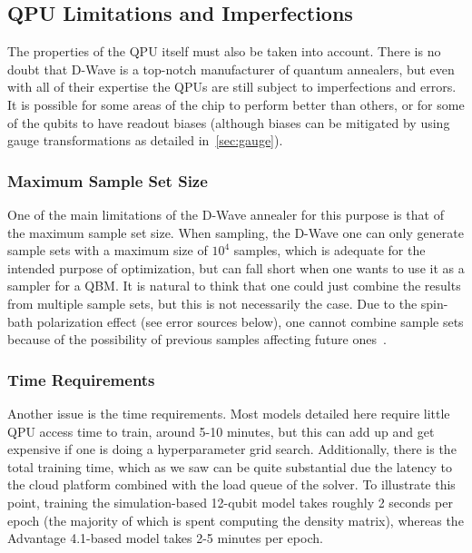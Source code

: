 \subsection{QPU Limitations and Imperfections}
The properties of the QPU itself must also be taken into account.
There is no doubt that D-Wave is a top-notch manufacturer of quantum annealers, but even with all of their expertise the QPUs are still subject to imperfections and errors.
It is possible for some areas of the chip to perform better than others, or for some of the qubits to have readout biases (although biases can be mitigated by using gauge transformations as detailed in~\cref{sec:gauge}).

\subsubsection{Maximum Sample Set Size}
One of the main limitations of the D-Wave annealer for this purpose is that of the maximum sample set size.
When sampling, the D-Wave one can only generate sample sets with a maximum size of \( 10^4 \) samples, which is adequate for the intended purpose of optimization, but can fall short when one wants to use it as a sampler for a QBM.
It is natural to think that one could just combine the results from multiple sample sets, but this is not necessarily the case.
Due to the spin-bath polarization effect (see error sources below), one cannot combine sample sets because of the possibility of previous samples affecting future ones~\cite{pochart_2021}.

\subsubsection{Time Requirements}
Another issue is the time requirements.
Most models detailed here require little QPU access time to train, around 5-10 minutes, but this can add up and get expensive if one is doing a hyperparameter grid search.
Additionally, there is the total training time, which as we saw can be quite substantial due the latency to the cloud platform combined with the load queue of the solver.
To illustrate this point, training the simulation-based 12-qubit model takes roughly 2 seconds per epoch (the majority of which is spent computing the density matrix), whereas the Advantage 4.1-based model takes 2-5 minutes per epoch.

